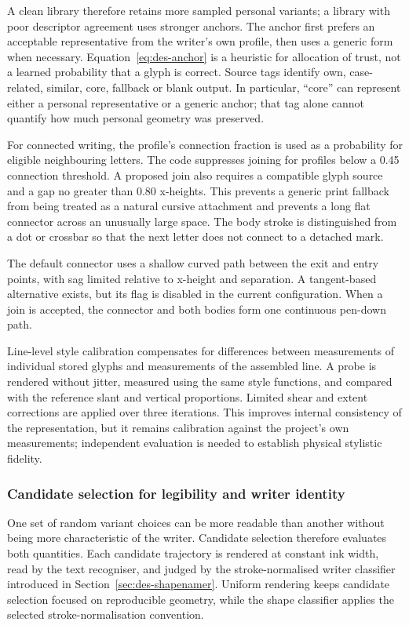 A clean library therefore retains more sampled personal variants; a library with poor descriptor agreement uses stronger anchors. The anchor first prefers an acceptable representative from the writer's own profile, then uses a generic form when necessary. Equation~\ref{eq:des-anchor} is a heuristic for allocation of trust, not a learned probability that a glyph is correct. Source tags identify own, case-related, similar, core, fallback or blank output. In particular, ``core'' can represent either a personal representative or a generic anchor; that tag alone cannot quantify how much personal geometry was preserved.

For connected writing, the profile's connection fraction is used as a probability for eligible neighbouring letters. The code suppresses joining for profiles below a 0.45 connection threshold. A proposed join also requires a compatible glyph source and a gap no greater than 0.80 x-heights. This prevents a generic print fallback from being treated as a natural cursive attachment and prevents a long flat connector across an unusually large space. The body stroke is distinguished from a dot or crossbar so that the next letter does not connect to a detached mark.

The default connector uses a shallow curved path between the exit and entry points, with sag limited relative to x-height and separation. A tangent-based alternative exists, but its flag is disabled in the current configuration. When a join is accepted, the connector and both bodies form one continuous pen-down path.

Line-level style calibration compensates for differences between measurements of individual stored glyphs and measurements of the assembled line. A probe is rendered without jitter, measured using the same style functions, and compared with the reference slant and vertical proportions. Limited shear and extent corrections are applied over three iterations. This improves internal consistency of the representation, but it remains calibration against the project's own measurements; independent evaluation is needed to establish physical stylistic fidelity.

\subsubsection{Candidate selection for legibility and writer identity}
\label{sec:des-selection}
One set of random variant choices can be more readable than another without being more characteristic of the writer. Candidate selection therefore evaluates both quantities. Each candidate trajectory is rendered at constant ink width, read by the text recogniser, and judged by the stroke-normalised writer classifier introduced in Section~\ref{sec:des-shapenamer}. Uniform rendering keeps candidate selection focused on reproducible geometry, while the shape classifier applies the selected stroke-normalisation convention.

